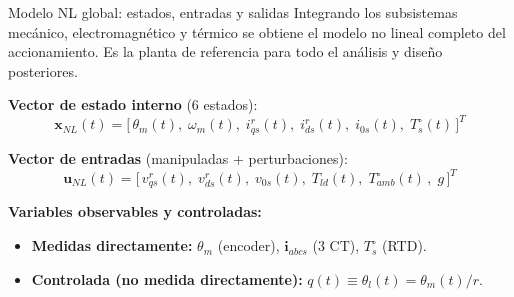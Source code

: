\documentclass[aspectratio=169,t]{beamer}
\begin{document}
\begin{frame}{Modelo NL global: estados, entradas y salidas}
{\small\color{uncGray}Integrando los subsistemas mecánico, electromagnético y térmico se obtiene el modelo no lineal completo del accionamiento. Es la planta de referencia para todo el análisis y diseño posteriores.}\par
\vspace{4mm}

\textbf{Vector de estado interno} (6 estados):
\begin{equation*}
\bm{x}_{NL}(t) = \big[\,\theta_m(t),\;\omega_m(t),\;i_{qs}^{r}(t),\;i_{ds}^{r}(t),\;i_{0s}(t),\;T_s^\circ(t)\,\big]^T
\end{equation*}

\textbf{Vector de entradas} (manipuladas + perturbaciones):
\begin{equation*}
\bm{u}_{NL}(t) = \big[\,v_{qs}^{r}(t),\;v_{ds}^{r}(t),\;v_{0s}(t),\;T_{ld}(t),\;T_{amb}^\circ(t)\,,\;g\,\big]^T
\end{equation*}

\textbf{Variables observables y controladas:}
\begin{itemize}\small
\item \textbf{Medidas directamente:} $\theta_m$ (encoder), $\bm{i}_{abcs}$ (3 CT), $T_s^\circ$ (RTD).
\item \textbf{Controlada (no medida directamente):} $q(t)\equiv\theta_l(t) = \theta_m(t)/r$.
\end{itemize}
\end{frame}
\end{document}
